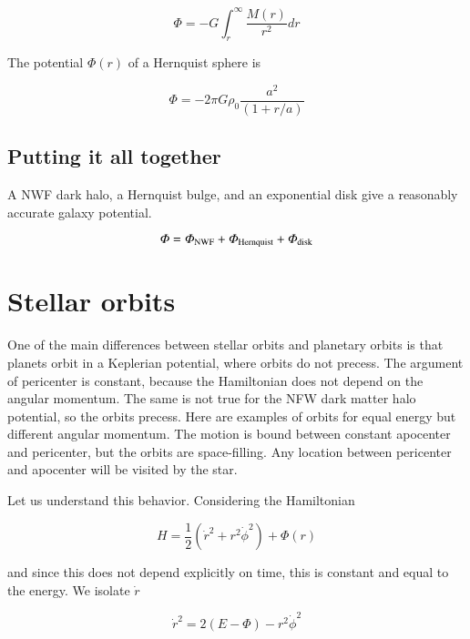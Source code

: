 \begin{equation}
\varPhi = -G\int_r^{\infty} \frac{M(r)}{r^2} dr
\end{equation}

The potential $\varPhi(r)$ of a Hernquist sphere is

\begin{equation}
\boxed{
\varPhi = -2\pi G \rho_0 \frac{a^2}{(1+r/a)}
}
\end{equation}


\subsection{Putting it all together}

A NWF dark halo, a Hernquist bulge, and an exponential disk give a reasonably accurate galaxy potential. 


\begin{equation}
\varPhi = \varPhi_{\rm NWF} + \varPhi_{\rm Hernquist} + \varPhi_{\rm disk}
\end{equation}

\section{Stellar orbits}

One of the main differences between stellar orbits and planetary orbits is that planets orbit in a Keplerian potential, where orbits do not precess. The argument of pericenter is constant, because the Hamiltonian does not depend on the angular momentum. The same is not true for the NFW dark matter halo potential, so the orbits precess. Here are examples of orbits for equal energy but different angular momentum. The motion is bound between constant apocenter and pericenter, but the orbits are space-filling. Any location between pericenter and apocenter will be visited by the star.    

Let us understand this behavior. Considering the Hamiltonian

\begin{equation}
H = \frac{1}{2}\left(\dot{r}^2 + r^2\dot\phi^2\right) + \varPhi(r) 
\end{equation}

and since this does not depend explicitly on time, this is constant and equal to the energy. We isolate $\dot{r}$  

\begin{equation}
\dot{r}^2 = 2(E-\varPhi) - r^2\dot\phi^2
\end{equation}


